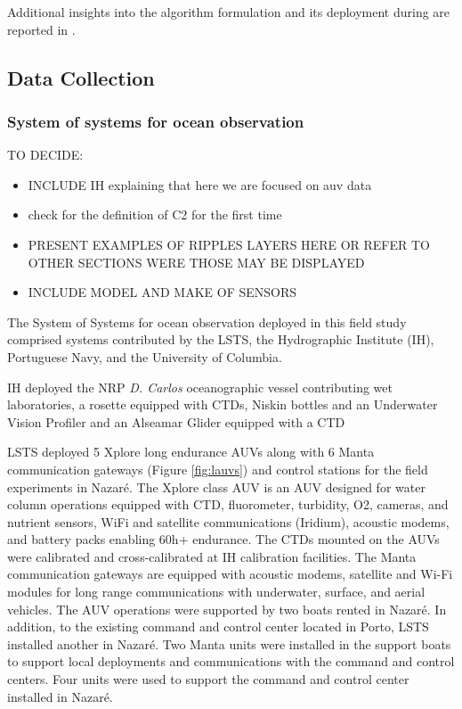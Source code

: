 Additional insights into the algorithm formulation and its deployment
during \proj are reported in \cite{bernacchi2025}.

\subsection{Data Collection}

\subsubsection{System of systems for ocean observation}

TO DECIDE: 
\begin{itemize}
    \item INCLUDE IH explaining that here we are focused on auv data
    \item check for the definition of C2 for the first time
    \item PRESENT EXAMPLES OF RIPPLES LAYERS HERE OR REFER TO OTHER SECTIONS WERE THOSE MAY BE DISPLAYED
    \item INCLUDE MODEL AND MAKE OF SENSORS
\end{itemize}

The System of Systems for ocean observation deployed in this field study
comprised systems contributed by the LSTS, the Hydrographic Institute
(IH), Portuguese Navy, and the University of Columbia.

IH deployed the NRP \emph{D. Carlos} oceanographic vessel contributing
wet laboratories, a rosette equipped with CTDs, Niskin bottles and an
Underwater Vision
Profiler %
and an Alseamar Glider equipped with a
CTD %

LSTS deployed 5 Xplore long endurance AUVs along with 6 Manta
communication gateways (Figure \ref{fig:lauvs}) and control stations for
the field experiments in Nazaré. The Xplore class AUV \cite{lauvurl} is
an AUV designed for water column operations equipped with CTD,
fluorometer, turbidity, O2, cameras, and nutrient sensors, WiFi and
satellite communications (Iridium), acoustic modems, and battery packs
enabling 60h+ endurance. The CTDs mounted on the AUVs were calibrated
and cross-calibrated at IH calibration facilities. The Manta
communication gateways \cite{} are equipped with acoustic modems,
satellite and Wi-Fi modules for long range communications with
underwater, surface, and aerial vehicles. The AUV operations were
supported by two boats rented in Nazaré. In addition, to the existing
command and control center located in Porto, LSTS installed another in
Nazaré. Two Manta units were installed in the support boats to support
local deployments and communications with the command and control
centers. Four units were used to support the command and control center
installed in Nazaré.

